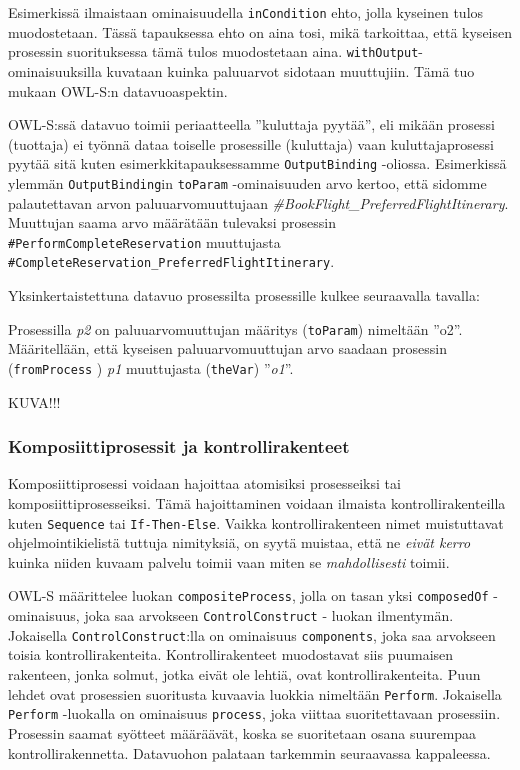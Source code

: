\documentclass[finnish]{tktltiki2}
\theoremstyle{definition}
\theoremstyle{remark}
\begin{document}
Esimerkissä ilmaistaan ominaisuudella \texttt{inCondition} ehto, jolla kyseinen tulos muodostetaan. Tässä tapauksessa ehto on aina tosi, mikä tarkoittaa, että kyseisen prosessin suorituksessa tämä tulos muodostetaan aina. \texttt{withOutput}-ominaisuuksilla kuvataan kuinka paluuarvot sidotaan muuttujiin. Tämä tuo mukaan OWL-S:n datavuoaspektin. 

OWL-S:ssä datavuo toimii periaatteella ''kuluttaja pyytää'', eli mikään prosessi (tuottaja) ei työnnä dataa toiselle prosessille (kuluttaja) vaan kuluttajaprosessi pyytää sitä kuten esimerkkitapauksessamme \texttt{OutputBinding} -oliossa. Esimerkissä ylemmän \texttt{OutputBinding}in \texttt{toParam} -ominaisuuden arvo kertoo, että sidomme palautettavan arvon paluuarvomuuttujaan \textit{\#BookFlight\_PreferredFlightItinerary}. Muuttujan saama arvo määrätään tulevaksi prosessin  \texttt{\#PerformCompleteReservation} muuttujasta \texttt{\#CompleteReservation\_PreferredFlightItinerary}. 

Yksinkertaistettuna datavuo prosessilta prosessille kulkee seuraavalla tavalla: 

Prosessilla \textit{p2} on paluuarvomuuttujan määritys (\texttt{toParam}) nimeltään ''o2''. Määritellään, että kyseisen paluuarvomuuttujan arvo saadaan prosessin (\texttt{fromProcess} ) \textit{p1} muuttujasta (\texttt{theVar}) ''\textit{o1}''.  

KUVA!!!

\subsubsection{Komposiittiprosessit ja kontrollirakenteet}

Komposiittiprosessi voidaan hajoittaa atomisiksi prosesseiksi tai komposiittiprosesseiksi\cite{OWLS}. Tämä hajoittaminen voidaan ilmaista kontrollirakenteilla kuten \texttt{Sequence} tai \texttt{If-Then-Else}. Vaikka kontrollirakenteen nimet muistuttavat ohjelmointikielistä tuttuja nimityksiä, on syytä muistaa, että ne \textit{eivät kerro} kuinka niiden kuvaam palvelu toimii vaan miten se \textit{mahdollisesti} toimii\cite{OWLS}. 

OWL-S määrittelee luokan \texttt{compositeProcess}, jolla on tasan yksi \texttt{composedOf} -ominaisuus, joka saa arvokseen \texttt{ControlConstruct} - luokan ilmentymän. Jokaisella \texttt{ControlConstruct}:lla on ominaisuus \texttt{components}, joka saa arvokseen toisia kontrollirakenteita\cite{OWLS}. Kontrollirakenteet muodostavat siis puumaisen rakenteen, jonka solmut, jotka eivät ole lehtiä, ovat kontrollirakenteita. Puun lehdet ovat prosessien suoritusta kuvaavia luokkia nimeltään \texttt{Perform}. Jokaisella \texttt{Perform} -luokalla on ominaisuus \texttt{process}, joka viittaa suoritettavaan prosessiin\cite{OWLS}.  Prosessin saamat syötteet määräävät, koska se suoritetaan osana suurempaa kontrollirakennetta. Datavuohon palataan tarkemmin seuraavassa kappaleessa.
\end{document}
